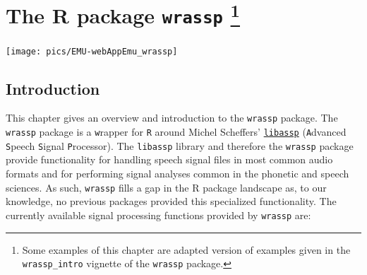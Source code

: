 \documentclass[]{book}
\let\rmarkdownfootnote\footnote%
\def\footnote{\protect\rmarkdownfootnote}
\begin{document}
\hypertarget{chap:wrassp}{%
\chapter[The R package \texttt{wrassp} ]{\texorpdfstring{The R package \texttt{wrassp} \footnote{Some examples of this chapter are adapted version of examples given in the \texttt{wrassp\_intro} vignette of the \texttt{wrassp} package.}}{The R package wrassp }}\label{chap:wrassp}}

\begin{center}\texttt{[image: pics/EMU-webAppEmu\_wrassp]} \end{center}

\hypertarget{introduction}{%
\section{Introduction}\label{introduction}}

This chapter gives an overview and introduction to the \texttt{wrassp} package. The \texttt{wrassp} package is a \texttt{w}rapper for \texttt{R} around Michel Scheffers' \href{http://libassp.sourceforge.net/}{\texttt{libassp}} (\texttt{A}dvanced \texttt{S}peech \texttt{S}ignal \texttt{P}rocessor). The \texttt{libassp} library and therefore the \texttt{wrassp} package provide functionality for handling speech signal files in most common audio formats and for performing signal analyses common in the phonetic and speech sciences. As such, \texttt{wrassp} fills a gap in the R package landscape as, to our knowledge, no previous packages provided this specialized functionality. The currently available signal processing functions provided by \texttt{wrassp} are:
\end{document}
